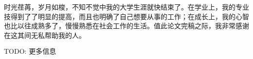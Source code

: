 时光荏苒，岁月如梭，不知不觉中我的大学生涯就快结束了。在学业上，我的专业技得到了了明显的提高，而且也明确了自己想要从事的工作；在成长上，我的心智也比以往成熟多了，慢慢熟悉在社会工作的生活。值此论文完稿之际，我非常感谢在这其间无私帮助我的人。

TODO: 更多信息

